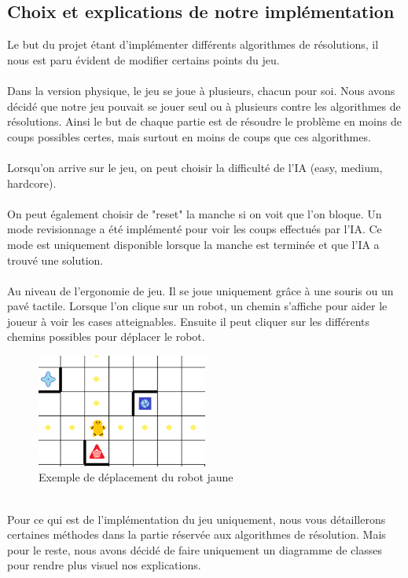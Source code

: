 \documentclass{article}
\begin{document}
\subsection{Choix et explications de notre implémentation}
Le but du projet étant d'implémenter différents algorithmes de résolutions, il nous est paru évident de modifier certains points du jeu.\\\\Dans la version physique, le jeu se joue à plusieurs, chacun pour soi. Nous avons décidé que notre jeu pouvait se jouer seul ou à plusieurs contre les algorithmes de résolutions. Ainsi le but de chaque partie est de résoudre le problème en moins de coups possibles certes, mais surtout en moins de coups que ces algorithmes.\\\\Lorsqu'on arrive sur le jeu, on peut choisir la difficulté de l'IA (easy, medium, hardcore).\\\\On peut également choisir de "reset" la manche si on voit que l'on bloque. Un mode revisionnage a été implémenté pour voir les coups effectués par l'IA. Ce mode est uniquement disponible lorsque la manche est terminée et que l'IA a trouvé une solution.\\\\
Au niveau de l'ergonomie de jeu. Il se joue uniquement grâce à une souris ou un pavé tactile. Lorsque l'on clique sur un robot, un chemin s'affiche pour aider le joueur à voir les cases atteignables. Ensuite il peut cliquer sur les différents chemins possibles pour déplacer le robot. 
\begin{figure}[h]
  \centering  
  \includegraphics[width=0.5\textwidth]{deplacement.png}  
  \caption{Exemple de déplacement du robot jaune} 
  \label{fig:Plateau}  
\end{figure}\\
Pour ce qui est de l'implémentation du jeu uniquement, nous vous détaillerons certaines méthodes dans la partie réservée aux algorithmes de résolution. Mais pour le reste, nous avons décidé de faire uniquement un diagramme de classes pour rendre plus visuel nos explications.
\end{document}
